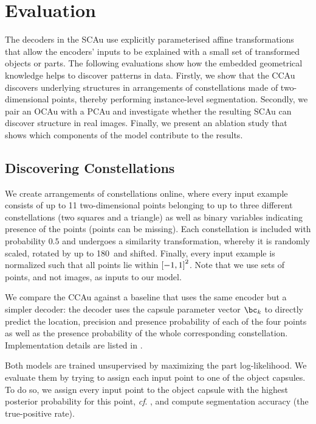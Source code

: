 \section{Evaluation}
\label{sec:experiments}

The decoders in the \gls{SCAu} use explicitly parameterised affine transformations
that allow the encoders' inputs to be explained with a small set of transformed objects or parts. 
The following evaluations show how the embedded geometrical knowledge helps to discover patterns in data.
Firstly, we show that the \gls{CCAu} discovers underlying structures in arrangements of constellations made of two-dimensional points, thereby performing instance-level segmentation.
Secondly, we pair an \gls{OCAu} with a \gls{PCAu} and investigate whether the resulting \gls{SCAu} can discover structure in real images.
Finally, we present an ablation study that shows which components of the model contribute to the results.

\subsection{Discovering Constellations}
\label{sec:constellation_expr}
We create arrangements of constellations online, where every input example consists of up to 11 two-dimensional points belonging to up to three different constellations (two squares and a triangle) as well as binary variables indicating presence of the points (points can be missing).
Each constellation is included with probability $0.5$ and undergoes a similarity transformation, whereby it is randomly scaled, rotated by up to 180\textdegree\ and shifted.
Finally, every input example is normalized such that all points lie within ${\left[-1, 1\right]}^2$.
Note that we use sets of points, and not images, as inputs to our model.

We compare the \gls{CCAu} against a baseline that uses the same encoder but a simpler decoder: the decoder uses the capsule parameter vector $\bc_k$ to directly predict the location, precision and presence probability of each of the four points as well as the presence probability of the whole corresponding constellation. 
Implementation details are listed in 
.

Both models are trained unsupervised by maximizing the part log-likelihood.
We evaluate them by trying to assign each input point to one of the object capsules.
To do so, we assign every input point to the object capsule with the highest posterior probability for this point, \textit{cf}. , and compute segmentation accuracy (\!\ie the true-positive rate).

